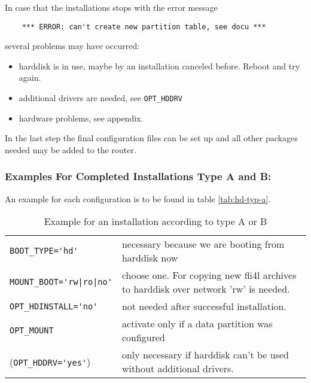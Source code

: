    In case that the installations stops with the error message
\begin{example}
\begin{verbatim}
    *** ERROR: can't create new partition table, see docu ***
\end{verbatim}
\end{example}
       several problems may have occurred:
        \begin{itemize}
        \item harddisk is in use, maybe by an installation canceled before.
        Reboot and try again.
        \item additional drivers are needed, see \verb*?OPT_HDDRV?
        \item hardware problems, see appendix.
        \end{itemize}
    In the last step the final configuration files can be set up and all other 
    packages needed may be added to the router.

\subsubsection{Examples For Completed Installations Type A and B:}

An example for each configuration is to be found in table
\ref{tab:hd-typ-a}.

\begin{table}[htb]
  \begin{center}
    \begin{small}
    \begin{tabular}{lp{9cm}}
    \verb*?BOOT_TYPE='hd'? & necessary because we are booting from harddisk now\\
    \verb*?MOUNT_BOOT='rw|ro|no'? &
                        choose one. For copying new fli4l archives to harddisk over 
                        network 'rw' is needed.\\

    \verb*?OPT_HDINSTALL='no'? & not needed after successful installation.\\


    \verb*?OPT_MOUNT? & activate only if a data partition was configured\\

    (\verb*?OPT_HDDRV='yes'?) & only necessary if harddisk can't be used without additional 
		       drivers.\\
    
    \end{tabular}
    \end{small}
    \caption{Example for an installation according to type A or B}
  \end{center}
\end{table}

